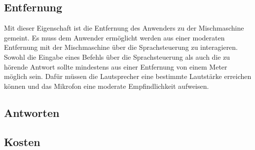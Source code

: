 \subsection{Entfernung}
Mit dieser Eigenschaft ist die Entfernung des Anwenders zu der Mischmaschine gemeint. Es muss dem Anwender ermöglicht werden aus einer moderaten Entfernung mit der Mischmaschine über die Sprachsteuerung zu interagieren. Sowohl die Eingabe eines Befehls über die Sprachsteuerung als auch die zu hörende Antwort sollte mindestens aus einer Entfernung von einem Meter möglich sein. Dafür müssen die Lautsprecher eine bestimmte Lautstärke erreichen können und das Mikrofon eine moderate Empfindlichkeit aufweisen.
\subsection{Antworten}
\subsection{Kosten}
\endinput